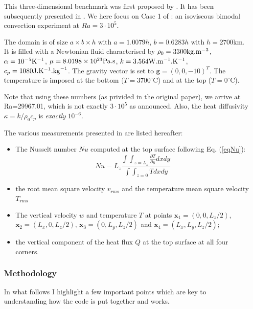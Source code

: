 
This three-dimensional benchmark was first proposed by \cite{bucc94}. 
It has been subsequently presented in \cite{tack94,trha98,albe00,onmm06,dawk11,krhb12}.
We here focus on Case 1 of \cite{bucc94}:  an isoviscous bimodal convection experiment at $Ra=3\cdot 10^5$.

The domain is of size $a\times b\times h$ with $a=1.0079h$, $b=0.6283h$ with $h=2700$km. It is filled with a Newtonian fluid characterised by $\rho_0=3300{\rm kg}.{\rm m}^{-3}$, $\alpha=10^{-5}{\rm K}^{-1}$, 
$\mu=8.0198\times10^{23}{\rm Pa.s}$, 
$k=3.564{\rm W}.{\rm m}^{-1}.{\rm K}^{-1}$, 
$c_p=1080{\rm J}.{\rm K}^{-1}.{\rm kg}^{-1}$.
The gravity vector is set to ${\bm g}=(0,0,-10)^T$.
The temperature is imposed at the bottom  ($T=3700^\circ$C) and at the top ($T=0^\circ$C).

Note that using these numbers (as privided in the original paper), we arrive at Ra=29967.01, which 
is not exactly $3\cdot10^5$ as announced. Also, the heat diffusivity $\kappa=k/\rho_0 c_p$ is 
{\it exactly} $10^{-6}$.

The various measurements presented in \cite{bucc94} are listed hereafter:
\begin{itemize}
\item The Nusselt number $Nu$ computed at the top surface following Eq. (\ref{eqNu}):
\[
Nu = L_z \frac{\int\int_{z=L_z} \frac{\partial T}{\partial y} dx dy  }{\int \int_{z=0} T dx dy}
\]
\item the root mean square velocity $v_{rms}$ and the temperature mean square velocity $T_{rms}$
\item The vertical velocity $w$ and temperature $T$ at points ${\bm x}_1=(0,0,L_z/2)$, ${\bm x}_2=(L_x,0,L_z/2)$,
${\bm x}_3=(0,L_y,L_z/2)$ and ${\bm x}_4=(L_x,L_y,L_z/2)$;
\item the vertical component of the heat flux $Q$ at the top surface  at all four corners. 
\end{itemize}

\subsubsection*{Methodology}

In what follows I highlight a few important points which are key to understanding how the code
is put together and works. 

